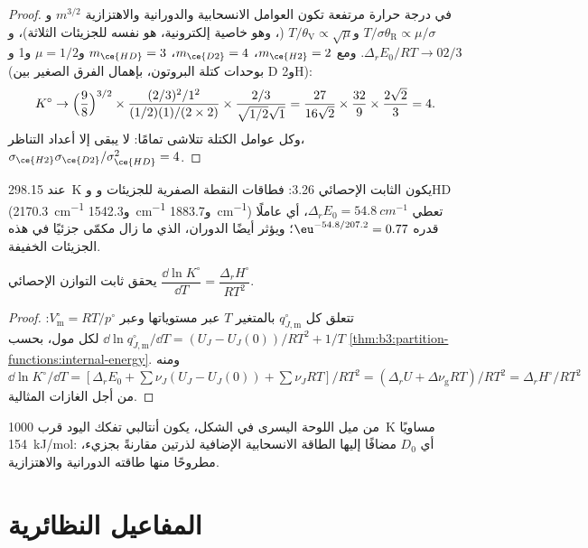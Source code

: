 \begin{proof}
في درجة حرارة مرتفعة تكون العوامل الانسحابية والدورانية والاهتزازية
$m^{3/2}$ و$T/\sigma\theta_{\mathrm R} \propto \mu/\sigma$ و$T/\theta_{\mathrm V} \propto \sqrt\mu$ (، وهو
خاصية إلكترونية، هو نفسه للجزيئات الثلاثة)، و$\Delta_rE_0/RT \to 0$.
ومع $m_{\ce{H2}} = 2$، $m_{\ce{D2}} = 4$، $m_{\ce{HD}} = 3$ و$\mu = 1/2$ و1 و$2/3$ (بوحدات
كتلة البروتون، بإهمال الفرق الصغير بين D و2H):
\[
  K^\circ \to \Bigl(\frac{9}{8}\Bigr)^{3/2} \times \frac{(2/3)^2/1^2}{(1/2)(1)/(2 \times 2)}
  \times \frac{2/3}{\sqrt{1/2}\sqrt1}
  = \frac{27}{16\sqrt2} \times \frac{32}{9} \times \frac{2\sqrt2}{3} = 4 .
\]
وكل عوامل الكتلة تتلاشى تمامًا: لا يبقى إلا أعداد التناظر، $\sigma_{\ce{H2}}
\sigma_{\ce{D2}}/\sigma_{\ce{HD}}^2 = 4$.
\end{proof}

عند \qty{298.15}{K} يكون الثابت الإحصائي 3.26: فطاقات النقطة الصفرية للجزيئات 
و وHD (\qty{2170.3}{cm^{-1}} و\qty{1542.3}{cm^{-1}} و\qty{1883.7}{cm^{-1}}) تعطي $\Delta_rE_0 =
\qty{54.8}{cm^{-1}}$، أي عاملًا قدره $\eu^{-54.8/207.2} = 0.77$؛ ويؤثر أيضًا الدوران، الذي ما زال مكمّى جزئيًا في
هذه الجزيئات الخفيفة.

\begin{proposition}\label{prop:b3:statistical-thermo-applied:vant-hoff-stat}
يحقق ثابت التوازن الإحصائي $\dfrac{\dd\ln K^\circ}{\dd T} = \dfrac{\Delta_rH^\circ}{RT^2}$.
\end{proposition}

\begin{proof}
تتعلق كل $q^\circ_{J,\mathrm m}$ بالمتغير $T$ عبر مستوياتها وعبر $V^\circ_{\mathrm m} = RT/p^\circ$:
$\dd\ln q^\circ_{J,\mathrm m}/\dd T = (U_J - U_J(0))/RT^2 + 1/T$ لكل مول، بحسب
\cref{thm:b3:partition-functions:internal-energy}. ومنه $\dd\ln K^\circ/\dd T =
[\Delta_rE_0 + \sum\nu_J(U_J - U_J(0)) + \sum\nu_JRT]/RT^2 = (\Delta_rU + \Delta\nu_{\mathrm g}RT)/RT^2 =
\Delta_rH^\circ/RT^2$ من أجل الغازات المثالية.
\end{proof}

من ميل اللوحة اليسرى في الشكل، يكون أنتالبي تفكك
اليود قرب \qty{1000}{K} مساويًا \qty{154}{kJ/mol}: أي $D_0$ مضافًا إليها الطاقة الانسحابية
الإضافية لذرتين مقارنةً بجزيء، مطروحًا منها طاقته الدورانية والاهتزازية.

\section{المفاعيل النظائرية}

